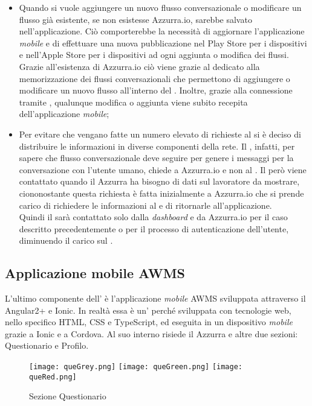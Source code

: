 \begin{trivlist}
\begin{itemize}
		\item Quando si vuole aggiungere un nuovo flusso conversazionale o modificare un flusso già esistente, se non esistesse Azzurra.io, sarebbe salvato nell'applicazione. Ciò comporterebbe la necessità di aggiornare l'applicazione \emph{mobile} e di effettuare una nuova pubblicazione nel Play Store per i dispositivi  e nell'Apple Store per i dispositivi  ad ogni aggiunta o modifica dei flussi. Grazie all'esistenza di Azzurra.io ciò viene grazie al  dedicato alla memorizzazione dei flussi conversazionali che permettono di aggiungere o modificare un nuovo flusso all'interno del . Inoltre, grazie alla connessione tramite , qualunque modifica o aggiunta viene subito recepita dell'applicazione \emph{mobile};
		\item Per evitare che vengano fatte un numero elevato di richieste al  si è deciso di distribuire le informazioni in diverse componenti della rete. Il , infatti, per sapere che flusso conversazionale deve seguire per genere i messaggi per la conversazione con l'utente umano, chiede a Azzurra.io e non al . Il  però viene contattato quando il  Azzurra ha bisogno di dati sul lavoratore da mostrare, ciononostante questa richiesta è fatta inizialmente a Azzurra.io che si prende carico di richiedere le informazioni al  e di ritornarle all'applicazione. \\
		Quindi il  sarà contattato solo dalla \emph{dashboard} e da Azzurra.io per il caso descritto precedentemente o per il processo di autenticazione dell'utente, diminuendo il carico sul .
	\end{itemize}
	
	\item\subsection{Applicazione mobile AWMS}
	L'ultimo componente dell' è l'applicazione \emph{mobile} \gls{AWMS} sviluppata attraverso il  Angular2+ e Ionic. In realtà essa è un' perché sviluppata con tecnologie web, nello specifico \gls{HTML}, \gls{CSS} e TypeScript, ed eseguita in un dispositivo \emph{mobile} grazie a Ionic e a Cordova. Al suo interno risiede il  Azzurra e altre due sezioni: Questionario e Profilo. 
	
	\begin{figure}[h]
		\centering
		\texttt{[image: queGrey.png]}\hfill
		\texttt{[image: queGreen.png]}\hfill
		\texttt{[image: queRed.png]}
		\caption{Sezione Questionario}\label{fig:que}
	\end{figure}
	

\end{trivlist}
